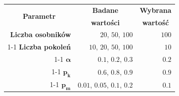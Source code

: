 \begin{tabular}{|r|r|r|}
  \hline
  \multicolumn{1}{|c|}{\multirow{2}{*}{%
    \centering\textbf{Parametr}%
  }} & \multicolumn{1}{c|}{\textbf{Badane}}
                & \multicolumn{1}{c|}{\textbf{Wybrana}} \\
  {} & \multicolumn{1}{c|}{\textbf{wartości}}
                & \multicolumn{1}{c|}{\textbf{wartość}} \\
  \hline
  \textbf{Liczba osobników} & $20$, $50$, $100$ & $100$ \\
  \cline{1-1}
  \textbf{Liczba pokoleń} & $10$, $20$, $50$, $100$ & $10$ \\
  \cline{1-1}
  $\boldsymbol{\alpha}$ & $0.1$, $0.2$, $0.3$ & $0.2$ \\
  \cline{1-1}
  $\boldsymbol{p_k}$ & $0.6$, $0.8$, $0.9$ & $0.9$ \\
  \cline{1-1}
  $\boldsymbol{p_m}$ & $0.01$, $0.05$, $0.1$, $0.2$ & $0.1$ \\
  \hline
\end{tabular}
